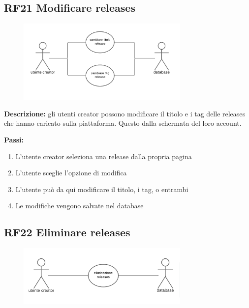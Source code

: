 \documentclass[a4paper,12pt]{article}
\begin{document}
\subsection*{RF21 Modificare releases}

\begin{figure}[htp]
    \centering
    \includegraphics[width=0.75\textwidth]{diagrams/use-case-21.png}
\end{figure}

\textbf{Descrizione:} gli utenti creator possono modificare il titolo e i tag delle releases che hanno caricato sulla piattaforma. Questo dalla schermata del loro account.

\textbf{Passi:}
\begin{enumerate}
    \item L’utente creator seleziona una release dalla propria pagina
    \item L'utente sceglie l’opzione di modifica
    \item L'utente può da qui modificare il titolo, i tag, o entrambi
    \item Le modifiche vengono salvate nel database
    
\end{enumerate}

\subsection*{RF22 Eliminare releases}

\begin{figure}[htp]
    \centering
    \includegraphics[width=0.75\textwidth]{diagrams/use-case-22.png}
\end{figure}
\end{document}
